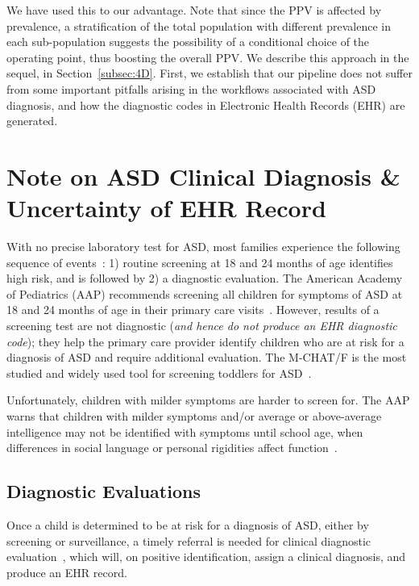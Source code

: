 \documentclass[onecolumn,,10pt]{IEEEtran}
\begin{document}
We have used this to our advantage. Note that since the PPV is affected by prevalence,  a stratification of the total population with different prevalence in each sub-population suggests the possibility of a conditional choice of the operating point, thus boosting the overall PPV. We describe this approach in the sequel, in Section~\ref{subsec:4D}. First, we establish that our pipeline does not suffer from some important pitfalls arising in the workflows associated with ASD diagnosis, and how the diagnostic codes in Electronic Health Records (EHR) are generated.
%
\section{Note on ASD Clinical Diagnosis \& Uncertainty of EHR Record}\label{sec:diag}
With no precise laboratory  test for ASD, most families experience the following sequence of events~\cite{gordon2016whittling,penner2018practice,hyman2020identification}: 1) routine screening at 18 and 24 months of age  identifies high risk, and   is followed by 2) a diagnostic evaluation. The American Academy of Pediatrics (AAP)  recommends screening all
children for symptoms of ASD
 at 18 and
24 months of age in their primary
care visits~\cite{johnson2007identification,zwaigenbaum2015early}.  However, results of a screening test are not
diagnostic (\textit{and hence do not produce an EHR diagnostic code}); they help the primary care
provider identify children who are at
risk for a diagnosis of ASD and
require additional evaluation. The M-CHAT/F is the
most studied and widely used tool
for screening toddlers for ASD~\cite{robins2014validation,hyman2020identification}.

Unfortunately, children with milder symptoms are harder to screen for.
The AAP warns that children with milder symptoms
and/or average or above-average
intelligence  may not be identified
with symptoms until  school age,
when differences in social language
or personal rigidities affect function~\cite{hyman2020identification}.
%
\subsection{Diagnostic Evaluations}\label{subsec:diageval}

Once a child is determined to be at
risk for a diagnosis of ASD, either by
screening or surveillance, a timely
referral is needed for clinical diagnostic
evaluation~\cite{penner2018practice}, which 
will, on positive identification, assign a clinical diagnosis, and 
produce an EHR record.
\end{document}
